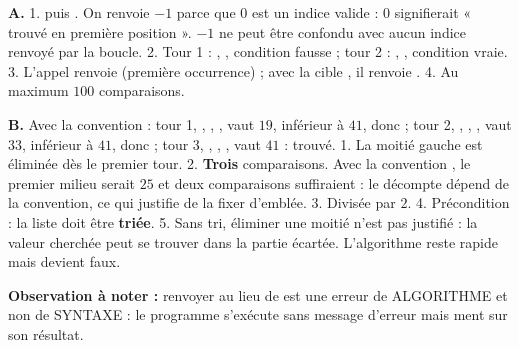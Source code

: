 \documentclass[10pt,a4paper]{article}
\begin{document}
\textbf{A.} 1.  puis . On renvoie $-1$ parce que $0$ est un indice
valide : $0$ signifierait « trouvé en première position ». $-1$ ne peut être confondu avec aucun indice
renvoyé par la boucle.
2. Tour 1 : , , condition fausse ; tour 2 : , , condition vraie.
3. L'appel renvoie  (première occurrence) ; avec la cible , il renvoie .
4. Au maximum $100$ comparaisons.

\textbf{B.} Avec la convention  :
tour 1, , , ,  vaut $19$, inférieur à $41$, donc  ;
tour 2, , , ,  vaut $33$, inférieur à $41$, donc  ;
tour 3, , , ,  vaut $41$ : trouvé.
1. La moitié gauche est éliminée dès le premier tour. 2. \textbf{Trois} comparaisons.
Avec la convention , le premier milieu serait $25$ et deux comparaisons
suffiraient : le décompte dépend de la convention, ce qui justifie de la fixer d'emblée. 3. Divisée par $2$.
4. Précondition : la liste doit être \textbf{triée}. 5. Sans tri, éliminer une moitié n'est pas justifié :
la valeur cherchée peut se trouver dans la partie écartée. L'algorithme reste rapide mais devient faux.

\textbf{Observation à noter :} renvoyer  au lieu de  est une erreur de \textsc{ALGORITHME}
et non de \textsc{SYNTAXE} : le programme s'exécute sans message d'erreur mais ment sur son résultat.
\end{document}
